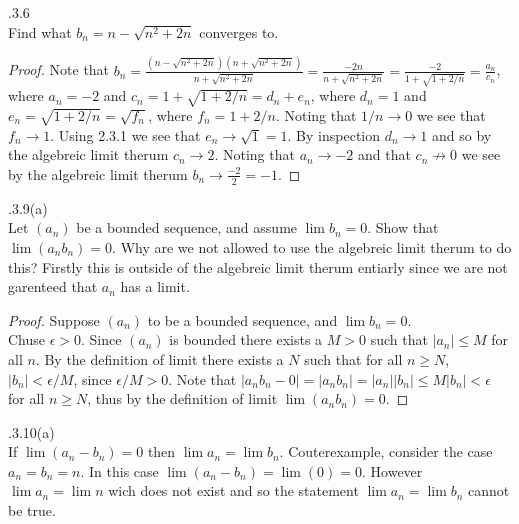\documentclass[12pt]{article}
\makeatletter
\theoremstyle{homework}
\newenvironment{exercise}[1]
{\def\@currentlabel{#1}\exercisecore}
{\endexercisecore}
\makeatother
\begin{document}
\begin{exercise}

2.3.6\\
Find what $b_n=n-\sqrt{n^2+2n}$ converges to.
\end{exercise}
\begin{proof}
Note that $b_n=\frac{(n-\sqrt{n^2+2n})(n+\sqrt{n^2+2n})}{n+\sqrt{n^2+2n}}=\frac{-2n}{n+\sqrt{n^2+2n}}=\frac{-2}{1+\sqrt{1+2/n}}=\frac{a_n}{c_n}$, where $a_n=-2$ and $c_n=1+\sqrt{1+2/n}=d_n+e_n$, where $d_n=1$ and $e_n=\sqrt{1+2/n}=\sqrt{f_n}$, where $f_n=1+2/n$.  Noting that $1/n\rightarrow 0$ we see that $f_n\rightarrow 1$.  Using 2.3.1 we see that $e_n\rightarrow \sqrt{1}=1$.  By inspection $d_n\rightarrow 1$ and so by the algebreic limit therum $c_n\rightarrow 2$.  Noting that $a_n\rightarrow -2$ and that $c_n\not\rightarrow 0$ we see by the algebreic limit therum $b_n\rightarrow \frac{-2}{2}=-1$.
\end{proof}

\begin{exercise}

2.3.9(a)\\
Let $(a_n)$ be a bounded sequence, and assume $\lim b_n=0$.  Show that $\lim (a_nb_n)=0$.  Why are we not allowed to use the algebreic limit therum to do this?
\end{exercise}
Firstly this is outside of the algebreic limit therum entiarly since we are not garenteed that $a_n$ has a limit.

\begin{proof}
Suppose $(a_n)$ to be a bounded sequence, and $\lim b_n=0$.\\
Chuse $\epsilon>0$.  Since $(a_n)$ is bounded there exists a $M>0$ such that $|a_n|\leq M$ for all $n$.  By the definition of limit there exists a $N$ such that for all $n\geq N$, $|b_n|<\epsilon/M$, since $\epsilon/M>0$.  Note that $|a_nb_n-0|=|a_nb_n|=|a_n||b_n|\leq M|b_n|<\epsilon$ for all $n\geq N$, thus by the definition of limit $\lim (a_nb_n)=0$.
\end{proof}

\begin{exercise}

2.3.10(a)\\
If $\lim(a_n-b_n)=0$ then $\lim a_n=\lim b_n$.
\end{exercise}
Couterexample, consider the case $a_n=b_n=n$.  In this case $\lim(a_n-b_n)=\lim (0)=0$.  However $\lim a_n=\lim n$ wich does not exist and so the statement $\lim a_n=\lim b_n$ cannot be true.
\end{document}
